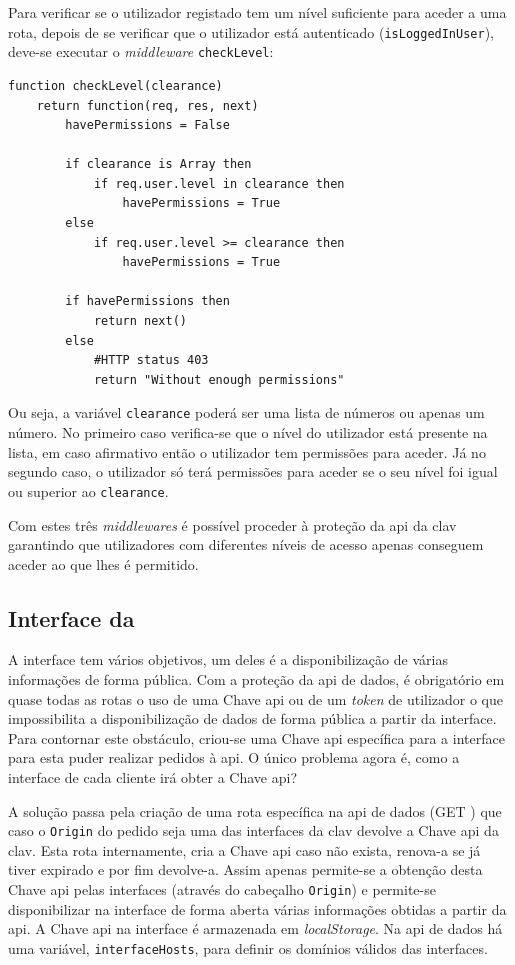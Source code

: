 Para verificar se o utilizador registado tem um nível suficiente para aceder a uma rota, depois de se verificar que o utilizador está autenticado (\texttt{isLoggedInUser}), deve-se executar o \textit{middleware} \texttt{checkLevel}:
\begin{lstlisting}[language=pseudocode, caption=Verificação se um utilizador registado tem permissões suficientes para aceder a uma determinada rota]
function checkLevel(clearance)
    return function(req, res, next)
        havePermissions = False

        if clearance is Array then
            if req.user.level in clearance then
                havePermissions = True
        else
            if req.user.level >= clearance then
                havePermissions = True

        if havePermissions then
            return next()
        else
            #HTTP status 403
            return "Without enough permissions"
\end{lstlisting}
Ou seja, a variável \texttt{clearance} poderá ser uma lista de números ou apenas um número. No primeiro caso verifica-se que o nível do utilizador está presente na lista, em caso afirmativo então o utilizador tem permissões para aceder. Já no segundo caso, o utilizador só terá permissões para aceder se o seu nível foi igual ou superior ao \texttt{clearance}.

Com estes três \textit{middlewares} é possível proceder à proteção da \acrshort{api} da \acrshort{clav} garantindo que utilizadores com diferentes níveis de acesso apenas conseguem aceder ao que lhes é permitido.

\subsection{Interface da }

A interface tem vários objetivos, um deles é a disponibilização de várias informações de forma pública. Com a proteção da \acrshort{api} de dados, é obrigatório em quase todas as rotas o uso de uma Chave \acrshort{api} ou de um \textit{token} de utilizador o que impossibilita a disponibilização de dados de forma pública a partir da interface. Para contornar este obstáculo, criou-se uma Chave \acrshort{api} específica para a interface para esta puder realizar pedidos à \acrshort{api}. O único problema agora é, como a interface de cada cliente irá obter a Chave \acrshort{api}?

A solução passa pela criação de uma rota específica na \acrshort{api} de dados (GET ) que caso o \texttt{Origin} do pedido seja uma das interfaces da \acrshort{clav} devolve a Chave \acrshort{api} da \acrshort{clav}. Esta rota internamente, cria a Chave \acrshort{api} caso não exista, renova-a se já tiver expirado e por fim devolve-a. Assim apenas permite-se a obtenção desta Chave \acrshort{api} pelas interfaces (através do cabeçalho \texttt{Origin}) e permite-se disponibilizar na interface de forma aberta várias informações obtidas a partir da \acrshort{api}. A Chave \acrshort{api} na interface é armazenada em \textit{localStorage}. Na \acrshort{api} de dados há uma variável, \texttt{interfaceHosts}, para definir os domínios válidos das interfaces.

